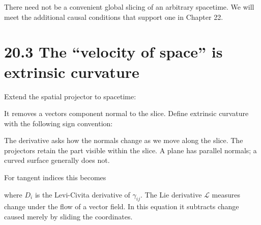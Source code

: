 \documentclass[
  11pt,
  letterpaper,
  oneside,
  openany]{scrbook}
\begin{document}
There need not be a convenient global slicing of an arbitrary spacetime.
We will meet the additional causal conditions that support one in
Chapter 22.

\hypertarget{the-velocity-of-space-is-extrinsic-curvature}{%
\section{20.3 The ``velocity of space'' is extrinsic
curvature}\label{the-velocity-of-space-is-extrinsic-curvature}}

Extend the spatial projector to spacetime:

\begin{center}
\begingroup
{}
\ifdim\wd\grmathbox>\linewidth
\resizebox{\linewidth}{!}{\usebox{\grmathbox}}
\else\usebox{\grmathbox}\fi
\endgroup
\end{center}

It removes a vector\textquotesingle s component normal to the slice.
Define extrinsic curvature with the following sign convention:

\begin{center}
\begingroup
{}
\ifdim\wd\grmathbox>\linewidth
\resizebox{\linewidth}{!}{\usebox{\grmathbox}}
\else\usebox{\grmathbox}\fi
\endgroup
\end{center}

The derivative asks how the normals change as we move along the slice.
The projectors retain the part visible within the slice. A plane has
parallel normals; a curved surface generally does not.

For tangent indices this becomes

\begin{center}
\begingroup
{}
\ifdim\wd\grmathbox>\linewidth
\resizebox{\linewidth}{!}{\usebox{\grmathbox}}
\else\usebox{\grmathbox}\fi
\endgroup
\end{center}

where \(D_i\) is the Levi-Civita derivative of \(\gamma_{ij}\). The Lie
derivative \(\mathcal L\) measures change under the flow of a vector
field. In this equation it subtracts change caused merely by sliding the
coordinates.
\end{document}
